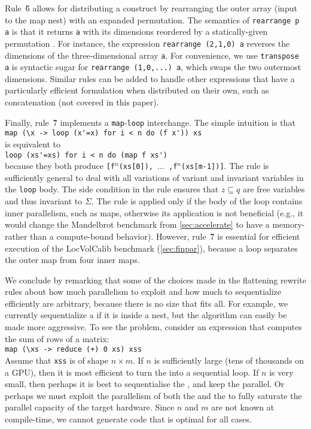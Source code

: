 Rule~\G{6} allows for distributing a  construct by
rearranging the outer array (input to the map nest) with an expanded
permutation.  The semantics of \lstinline{rearrange p a} is that it
returns \lstinline{a} with its dimensions reordered by a
statically-given permutation . For instance, the expression
\mbox{\lstinline{rearrange (2,1,0) a}} reverses the dimensions of the
three-dimensional array \lstinline{a}.
%
For convenience, we use \mbox{\lstinline{transpose a}} is syntactic
sugar for \mbox{\lstinline{rearrange (1,0,...) a}}, which swaps the two
  outermost dimensions.
%
Similar rules can be added to handle other expressions
that have a particularly efficient formulation when distributed on
their own, such as concatenation (not covered in this paper).

Finally, rule~\G{7} implements a \lstinline{map}-\lstinline{loop}
interchange.  The
simple intuition is that\\
\hspace*{0.5cm}\lstinline!map (\x -> loop (x'=x) for i < n do (f x')) xs!\\
is equivalent to\\
\hspace*{0.5cm}\lstinline!loop (xs'=xs) for i < n do (map f xs')!\\
because they both produce \texttt{[f$^n$(xs[0]), $\ldots$
  ,f$^n$(xs[m-1])]}.  The rule is sufficiently general to deal with
all variations of variant and invariant variables in the
\lstinline{loop} body.  The side condition in the rule ensures that
$z \subseteq q$ are free variables and thus invariant to $\Sigma$.
The rule is applied only if the body of the loop contains inner
parallelism, such as maps, otherwise its application is not beneficial
(e.g., it would change the Mandelbrot benchmark from
\cref{sec:accelerate} to have a memory- rather than a compute-bound
behavior).
%
However, rule~\G{7} is essential for efficient execution of the
LocVolCalib benchmark (\cref{sec:finpar}), because a loop separates
the outer map from four inner maps.

We conclude by remarking that some of the choices made in the
flattening rewrite rules about how much parallelism to exploit and how
much to sequentialize efficiently are arbitrary, because there is no
size that fits all.  For example, we currently sequentialize a
\StreamPar{} if it is inside a \Map{} nest, but the algorithm can
easily be made more aggressive.  To see the problem, consider an
expression that computes the sum of rows of a matrix:\\
\hspace*{0.5cm}\lstinline{map (\xs -> reduce (+) 0 xs) xss}\\
Assume that \lstinline{xss} is of shape $n\times{}m$.  If $n$ is
sufficiently large (tens of thousands on a GPU), then it is most
efficient to turn the  into a sequential loop.  If $n$ is
very small, then perhaps it is best to sequentialise the , and
keep the  parallel.  Or perhaps we must exploit the
parallelism of both the  and the  to fully saturate
the parallel capacity of the target hardware.  Since $n$ and $m$ are
not known at compile-time, we cannot generate code that is optimal for
all cases.

